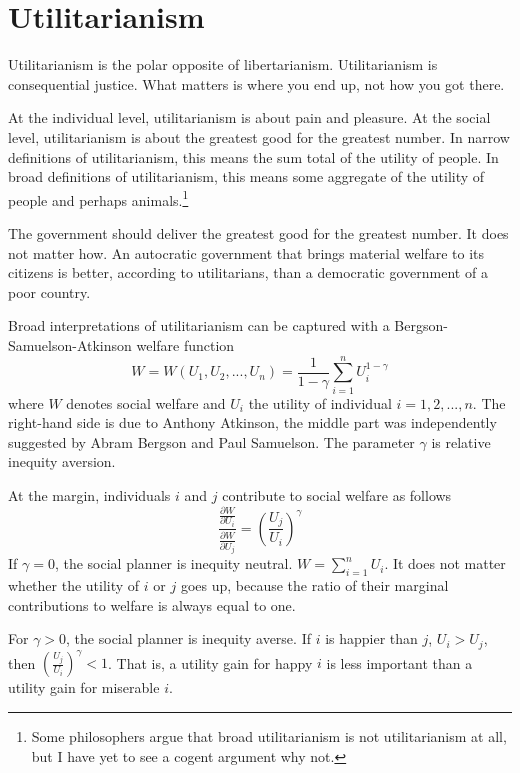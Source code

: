 \section{Utilitarianism}
Utilitarianism is the polar opposite of libertarianism. Utilitarianism is consequential justice. What matters is where you end up, not how you got there.

At the individual level, utilitarianism is about pain and pleasure. At the social level, utilitarianism is about the greatest good for the greatest number. In narrow definitions of utilitarianism, this means the sum total of the utility of people. In broad definitions of utilitarianism, this means some aggregate of the utility of people and perhaps animals.\footnote{Some philosophers argue that broad utilitarianism is not utilitarianism at all, but I have yet to see a cogent argument why not.}

The government should deliver the greatest good for the greatest number. It does not matter how. An autocratic government that brings material welfare to its citizens is better, according to utilitarians, than a democratic government of a poor country.

Broad interpretations of utilitarianism can be captured with a Bergson-Samuelson-Atkinson welfare function
\begin{equation}
\label{eq:Bergson}
    W = W(U_1, U_2, ..., U_n) = \frac{1}{1-\gamma} \sum_{i=1}^n U_i^{1-\gamma}
\end{equation}
where $W$ denotes social welfare and $U_i$ the utility of individual $i=1,2, ..., n$. The right-hand side is due to Anthony Atkinson, the middle part was independently suggested by Abram Bergson and Paul Samuelson. The parameter $\gamma$ is relative inequity aversion.

At the margin, individuals $i$ and $j$ contribute to social welfare as follows
\begin{equation}
    \frac{\frac{\partial W}{\partial U_i}}{\frac{\partial W}{\partial U_j}} = \left (\frac{U_j}{U_i} \right )^\gamma
\end{equation}
If $\gamma=0$, the social planner is inequity neutral. $W=\sum_{i=1}^n U_i$. It does not matter whether the utility of $i$ or $j$ goes up, because the ratio of their marginal contributions to welfare is always equal to one.

For $\gamma>0$, the social planner is inequity averse. If $i$ is happier than $j$, $U_i > U_j$, then $\left (\frac{U_j}{U_i} \right )^\gamma < 1$. That is, a utility gain for happy $i$ is less important than a utility gain for miserable $i$.

